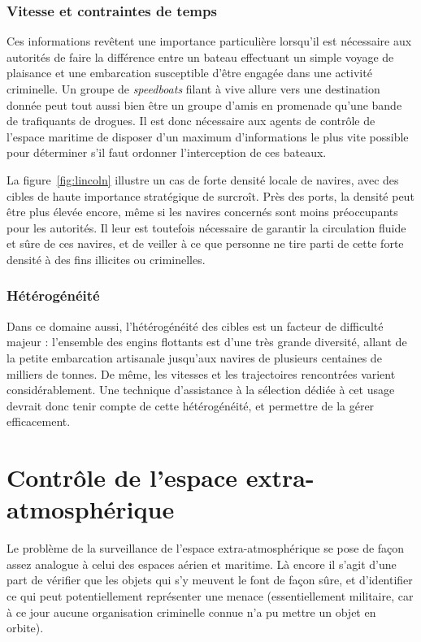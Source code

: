	\subsubsection{Vitesse et contraintes de temps}
	Ces informations revêtent une importance particulière lorsqu'il est nécessaire aux autorités de faire la différence entre un bateau effectuant un simple voyage de plaisance et une embarcation susceptible d'être engagée dans une activité criminelle. Un groupe de \emph{speedboats} filant à vive allure vers une destination donnée peut tout aussi bien être un groupe d'amis en promenade qu'une bande de trafiquants de drogues. Il est donc nécessaire aux agents de contrôle de l'espace maritime de disposer d'un maximum d'informations le plus vite possible pour déterminer s'il faut ordonner l'interception de ces bateaux.
	
	La figure~\ref{fig:lincoln} illustre un cas de forte densité locale de navires, avec des cibles de haute importance stratégique de surcroît. Près des ports, la densité peut être plus élevée encore, même si les navires concernés sont moins préoccupants pour les autorités. Il leur est toutefois nécessaire de garantir la circulation fluide et sûre de ces navires, et de veiller à ce que personne ne tire parti de cette forte densité à des fins illicites ou criminelles.
	
	\subsubsection{Hétérogénéité}
	Dans ce domaine aussi, l'hétérogénéité des cibles est un facteur de difficulté majeur : l'ensemble des engins flottants est d'une très grande diversité, allant de la petite embarcation artisanale jusqu'aux navires de plusieurs centaines de milliers de tonnes. De même, les vitesses et les trajectoires rencontrées varient considérablement. Une technique d'assistance à la sélection dédiée à cet usage devrait donc tenir compte de cette hétérogénéité, et permettre de la gérer efficacement.
	
	\section{Contrôle de l'espace extra-atmosphérique}
	Le problème de la surveillance de l'espace extra-atmosphérique se pose de façon assez analogue à celui des espaces aérien et maritime. Là encore il s'agit d'une part de vérifier que les objets qui s'y meuvent le font de façon sûre, et d'identifier ce qui peut potentiellement représenter une menace (essentiellement militaire, car à ce jour aucune organisation criminelle connue n'a pu mettre un objet en orbite).
	

